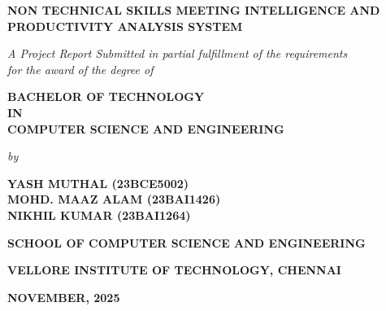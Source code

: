 \documentclass[12pt,a4paper,oneside]{report}
\begin{document}
\begin{titlepage}
\thispagestyle{empty}
\begin{center}
  \vspace*{0.5cm}

  
  \vspace{0.8cm}
  
  {\fontsize{20}{24}\bfseries NON TECHNICAL SKILLS MEETING INTELLIGENCE AND PRODUCTIVITY ANALYSIS SYSTEM\par}
  
  \vspace{0.8cm}
  
  {\fontsize{13}{16}\itshape A Project Report Submitted in partial fulfillment of the requirements\\for the award of the degree of\par}
  
  \vspace{0.6cm}
  
  {\fontsize{16}{20}\bfseries BACHELOR OF TECHNOLOGY\\IN\\COMPUTER SCIENCE AND ENGINEERING\par}
  
  \vspace{0.8cm}
  
  {\fontsize{13}{16}\itshape by\par}
  
  \vspace{0.4cm}
  
  {\fontsize{14}{18}\bfseries
  YASH MUTHAL \quad (23BCE5002)\\[4pt]
  MOHD. MAAZ ALAM \quad (23BAI1426)\\[4pt]
  NIKHIL KUMAR \quad (23BAI1264)\par}
  
  \vfill
  
  {\fontsize{15}{18}\bfseries SCHOOL OF COMPUTER SCIENCE AND ENGINEERING\par}
  \vspace{0.2cm}
  {\fontsize{15}{18}\bfseries VELLORE INSTITUTE OF TECHNOLOGY, CHENNAI\par}
  \vspace{0.4cm}
  {\fontsize{12}{15}\bfseries NOVEMBER, 2025\par}

\end{center}
\end{titlepage}
\end{document}
